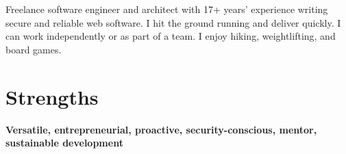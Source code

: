 \documentclass[a4paper,10pt]{article}
\begin{document}

    Freelance software engineer and architect with 17+ years' experience writing secure and reliable web software.
    I hit the ground running and deliver quickly. I can work independently or as part of a team.
    I enjoy hiking, weightlifting, and board games.


          \section{Strengths}

          \textbf{Versatile, entrepreneurial, proactive, security-conscious, mentor, sustainable development}
\end{document}
